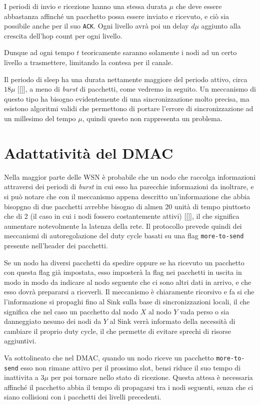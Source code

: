 \documentclass[pdftex,12pt,a4paper,italian,openany]{book}
\begin{document}
I periodi di invio e ricezione hanno una stessa durata $\mu$ che deve essere abbastanza affinché 
un pacchetto possa essere inviato e ricevuto, e ciò sia possibile anche per il suo \texttt{ACK}.
Ogni livello avrà poi un delay $d\mu$ aggiunto alla crescita dell'hop count per ogni livello. 
 
Dunque ad ogni tempo $t$ teoricamente saranno solamente i nodi ad un certo livello a 
trasmettere, limitando la contesa per il canale. 

Il periodo di sleep ha una durata nettamente maggiore del periodo attivo, circa $18\mu$ [[]], a meno di \emph{burst} di pacchetti, come vedremo in seguito.
Un meccanismo di questo tipo ha bisogno evidentemente di una sincronizzazione molto precisa, ma 
esistono algoritmi validi che permettono di portare l'errore di sincronizzazione ad un millesimo 
del tempo $\mu$, quindi questo non rappresenta un problema. 

\section{Adattatività del DMAC}
Nella maggior parte delle WSN è probabile che un nodo che raccolga informazioni attraversi dei
periodi di \emph{burst} in cui esso ha parecchie informazioni da inoltrare, e si può notare che 
con il meccanismo appena descritto un'informazione che abbia bisopgno di due pacchetti avrebbe 
bisogno di almen 20 unità di tempo piuttosto che di 2 (il caso in cui i nodi fossero 
costantemente attivi) [[]], il che significa aumentare notevolmente la latenza della rete. 
Il protocollo prevede quindi dei meccanismi di autoregolazione del duty cycle basati su una flag 
\texttt{more-to-send} presente nell'header dei pacchetti.

Se un nodo ha diversi pacchetti da spedire oppure se ha ricevuto un pacchetto con questa flag
già impostata, esso imposterà la flag nei pacchetti in uscita in modo in modo da indicare al 
nodo seguente che ci sono altri dati in arrivo, e che esso dovrà prepararsi a riceverli. 
Il meccanismo è chiaramente ricorsivo e fa si che l'informazione si propaghi fino al Sink 
sulla base di sincronizzazioni locali, il che significa che nel caso un pacchetto dal nodo $X$ 
al nodo $Y$ vada perso o sia danneggiato nesuno dei nodi da $Y$ al Sink verrà informato della necessità di  cambiare il proprio duty cycle, il che permette di evitare sprechi di risorse 
aggiuntivi.

Va sottolineato che nel DMAC, quando un nodo riceve un pacchetto \texttt{more-to-send} esso non 
rimane attivo per il prossimo slot, bensi riduce il suo tempo di inattivita a $3\mu$ per poi tornare nello stato di ricezione. Questa attesa è necessaria affinché il pacchetto abbia il tempo di propagarsi tra i nodi seguenti, senza che ci siano collisioni con i pacchetti dei livelli precedenti. 
\end{document}
